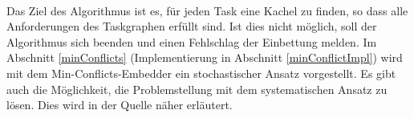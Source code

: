 \ \\
Das Ziel des Algorithmus ist es, für jeden Task eine Kachel zu finden, so dass alle Anforderungen des Taskgraphen erfüllt sind. Ist dies nicht möglich, soll der Algorithmus sich beenden und einen Fehlschlag der Einbettung melden. Im Abschnitt \ref{minConflicts} (Implementierung in Abschnitt \ref{minConflictImpl}) wird mit dem Min-Conflicts-Embedder ein stochastischer Ansatz vorgestellt. Es gibt auch die Möglichkeit, die Problemstellung mit dem systematischen Ansatz zu lösen. Dies wird in der Quelle \cite{jaeger} näher erläutert.

